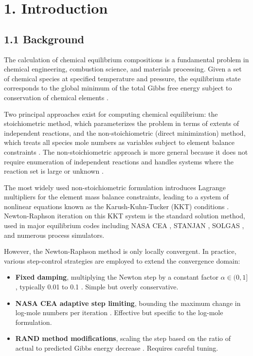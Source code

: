 \documentclass[review,3p]{elsarticle}
\begin{document}
\section{1. Introduction}



\subsection{1.1 Background}

The calculation of chemical equilibrium compositions is a fundamental problem in chemical engineering, combustion science, and materials processing. Given a set of chemical species at specified temperature and pressure, the equilibrium state corresponds to the global minimum of the total Gibbs free energy subject to conservation of chemical elements \citep{White1958, SmithMissen1982}.

Two principal approaches exist for computing chemical equilibrium: the stoichiometric method, which parameterizes the problem in terms of extents of independent reactions, and the non-stoichiometric (direct minimization) method, which treats all species mole numbers as variables subject to element balance constraints \citep{SmithVanNess2005}. The non-stoichiometric approach is more general because it does not require enumeration of independent reactions and handles systems where the reaction set is large or unknown \citep{GordonMcBride1994}.

The most widely used non-stoichiometric formulation introduces Lagrange multipliers for the element mass balance constraints, leading to a system of nonlinear equations known as the Karush-Kuhn-Tucker (KKT) conditions \citep{SmithMissen1982, Michelsen2007}. Newton-Raphson iteration on this KKT system is the standard solution method, used in major equilibrium codes including NASA CEA \citep{GordonMcBride1994, McBrideGordon1996}, STANJAN \citep{Reynolds1986}, SOLGAS \citep{Eriksson1971}, and numerous process simulators.

However, the Newton-Raphson method is only locally convergent. In practice, various step-control strategies are employed to extend the convergence domain:

\begin{itemize}
  \item \textbf{Fixed damping}, multiplying the Newton step by a constant factor $\alpha \in (0,1]$, typically 0.01 to 0.1 \citep{Greiner1991}. Simple but overly conservative.
  \item \textbf{NASA CEA adaptive step limiting}, bounding the maximum change in log-mole numbers per iteration \citep{GordonMcBride1994}. Effective but specific to the log-mole formulation.
  \item \textbf{RAND method modifications}, scaling the step based on the ratio of actual to predicted Gibbs energy decrease \citep{Tsanas2018}. Requires careful tuning.
\end{itemize}
\end{document}
